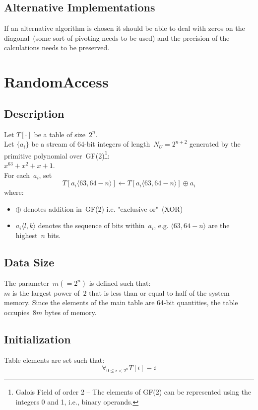 \documentclass[twocolumn]{article}
\newcommand{\RANDA}{\textsf{RandomAccess}\xspace}
\begin{document}
\subsection{Alternative Implementations}
If an alternative algorithm is chosen it should be able to deal with zeros on
the diagonal~(some sort of pivoting needs to be used) and the precision of the
calculations needs to be preserved.

\section{\RANDA}
\subsection{Description}
Let $T[\cdot]$ be a table of size~$2^n$. \\
Let $\{a_i\}$ be a stream of 64-bit integers of length~$N_U=2^{n+2}$ generated by
the primitive polynomial over~GF(2)\footnote{Galois Field of order 2 -- The
  elements of GF(2) can be represented using the integers 0 and 1, i.e., binary
  operands.}: \\ $x^{63}+x^2+x+1$. \\
For each~$a_i$, set
\begin{equation}
  T[a_i\langle 63,64-n\rangle] \leftarrow T[a_i\langle 63,64-n\rangle]\oplus a_i
\label{eqn:raupdate}
\end{equation}
where:
\begin{itemize}
\item $\oplus$ denotes addition in~GF(2) i.e. "exclusive or"~(XOR)
\item $a_i\langle l,k\rangle$ denotes the sequence of bits within~$a_i$, e.g.
  $\langle 63, 64-n\rangle$ are the highest~$n$ bits.
\end{itemize}

\subsection{Data Size}
The parameter~$m(=2^n)$ is defined such that: \\
$m$ is the largest power of~$2$ that is less than or equal to half of the
system memory.  Since the elements of the main table are 64-bit quantities, the
table occupies~$8m$ bytes of memory.

\subsection{Initialization}
Table elements are set such that:
\begin{equation}
  \forall_{0\le i< 2^n} T[i]\equiv i
\label{eqn:raset}
\end{equation}
\end{document}
